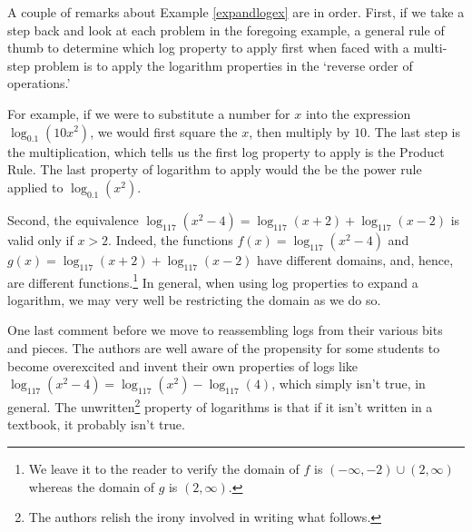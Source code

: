 A couple of remarks about Example \ref{expandlogex} are in order.  First, if we take a step back and look at each problem in the foregoing example, a general rule of thumb to determine which log property to apply first when faced with a multi-step problem is to apply the logarithm properties in the  `reverse order of operations.'

\smallskip

For example, if we were to substitute a number for $x$ into the expression $\log_{0.1} \left(10 x^2 \right)$, we would first square the $x$, then multiply by $10$.  The last step is the multiplication, which tells us the first log property to apply is the Product Rule.  The last property of logarithm to apply would the be the power rule applied to $\log_{0.1}(x^2)$.

\smallskip

Second,  the equivalence $\log_{117}\left(x^2-4\right) = \log_{117}(x+2) + \log_{117}(x-2)$ is valid only if $x > 2$.  Indeed,  the functions $f(x) = \log_{117}\left(x^2-4\right)$ and $g(x) = \log_{117}(x+2) + \log_{117}(x-2)$ have different domains, and, hence, are different functions.\footnote{We leave it to the reader to verify the domain of $f$ is $(-\infty, -2) \cup (2,\infty)$ whereas the domain of $g$ is $(2,\infty)$.} In general, when using log properties to expand a logarithm, we may very well be restricting the domain as we do so. 

\smallskip

One last comment before we move to reassembling logs from their various bits and pieces. The authors are well aware of the propensity for some students to become overexcited and invent their own properties of logs like $\log_{117}\left(x^2-4\right) = \log_{117}\left(x^2\right) - \log_{117}(4)$, which simply isn't true, in general.  The unwritten\footnote{The authors relish the irony involved in writing what follows.} property of logarithms is that if it isn't written in a textbook, it probably isn't true.    

